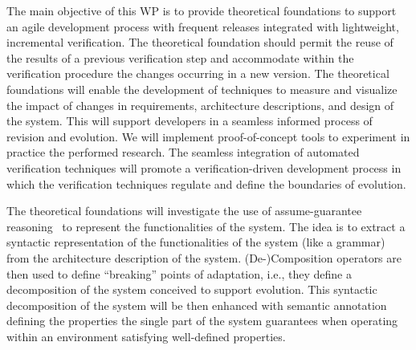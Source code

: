 \documentclass[12pt]{article}
\newcommand{\ugh}[1]{\textcolor{red}{\uwave{#1}}} %
\newcommand{\nb}[2]{
    \fcolorbox{gray}{yellow}{\bfseries\sffamily\scriptsize#1}
    {\sf\small$\blacktriangleright$\textit{#2}$\blacktriangleleft$}
   }
\newcommand{\ugh}[1]{#1} %
\newcommand{\nb}[2]{}
\newcommand\ivica[1]{\nb{Ivica}{#1}}
\begin{document}
\noindent The main objective of this WP is to provide theoretical foundations to %
support an agile development process with frequent releases integrated with lightweight, incremental verification.  The theoretical foundation should permit the %
reuse %
of the results of a previous verification step and accommodate within the verification procedure the changes  occurring in a new version.
The theoretical foundations %
will enable the development of techniques to measure and visualize the impact of changes in 
 requirements,  architecture descriptions, and design of the system. This will support developers in a seamless %
 informed process of revision and evolution. We will implement proof-of-concept tools to experiment in practice the performed research. %
The seamless integration of automated verification techniques will promote a verification-driven development process in which the verification techniques regulate and define the boundaries of evolution. 

The theoretical foundations will investigate %
the use of assume-guarantee reasoning~\cite{Pnueli1989} to represent the functionalities of the system. %
The idea is to extract a syntactic representation of the functionalities of the system (like a grammar) from the architecture description of the system. %
(De-)Composition operators are then used to define ``breaking'' points of adaptation, i.e., they define a decomposition of the system conceived to support evolution. This syntactic decomposition of the system will be then enhanced with semantic annotation defining the properties the single part of the system guarantees when operating within an environment satisfying well-defined properties.
\end{document}
